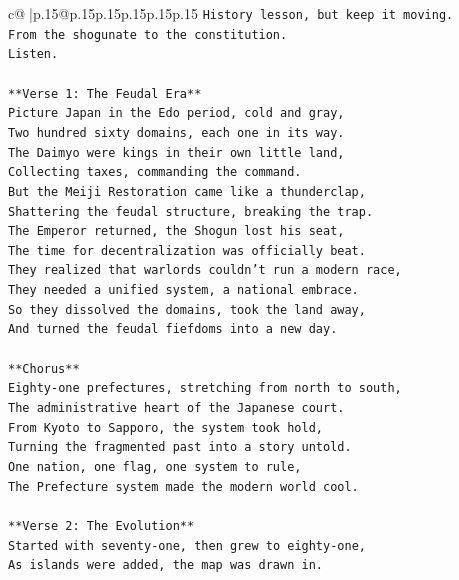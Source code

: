 \documentclass{article}
\begin{document}
{\begin{supertabular}{c@{$\;$}|p{.15\linewidth}@{}p{.15\linewidth}p{.15\linewidth}p{.15\linewidth}p{.15\linewidth}p{.15\linewidth}}
{{{\texttt{History lesson, but keep it moving.} \\
\texttt{From the shogunate to the constitution.} \\
\texttt{Listen.} \\
\\ 
\texttt{**Verse 1: The Feudal Era**} \\
\texttt{Picture Japan in the Edo period, cold and gray,} \\
\texttt{Two hundred sixty domains, each one in its way.} \\
\texttt{The Daimyo were kings in their own little land,} \\
\texttt{Collecting taxes, commanding the command.} \\
\texttt{But the Meiji Restoration came like a thunderclap,} \\
\texttt{Shattering the feudal structure, breaking the trap.} \\
\texttt{The Emperor returned, the Shogun lost his seat,} \\
\texttt{The time for decentralization was officially beat.} \\
\texttt{They realized that warlords couldn't run a modern race,} \\
\texttt{They needed a unified system, a national embrace.} \\
\texttt{So they dissolved the domains, took the land away,} \\
\texttt{And turned the feudal fiefdoms into a new day.} \\
\\ 
\texttt{**Chorus**} \\
\texttt{Eighty{-}one prefectures, stretching from north to south,} \\
\texttt{The administrative heart of the Japanese court.} \\
\texttt{From Kyoto to Sapporo, the system took hold,} \\
\texttt{Turning the fragmented past into a story untold.} \\
\texttt{One nation, one flag, one system to rule,} \\
\texttt{The Prefecture system made the modern world cool.} \\
\\ 
\texttt{**Verse 2: The Evolution**} \\
\texttt{Started with seventy{-}one, then grew to eighty{-}one,} \\
\texttt{As islands were added, the map was drawn in.} \\
}}}
\end{supertabular}}
\end{document}
